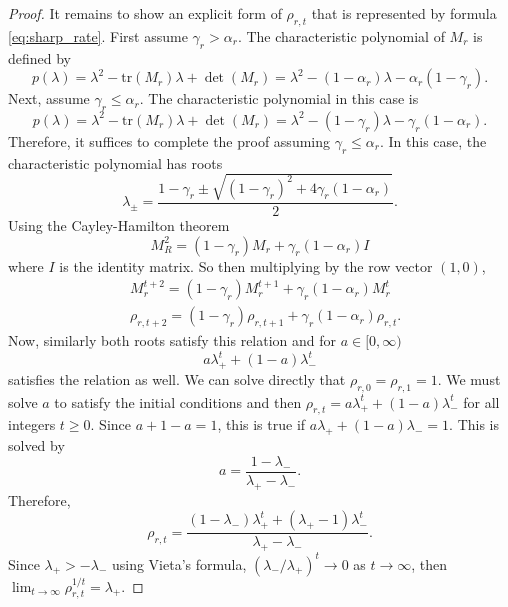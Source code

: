\documentclass[ejsv2, noshowframe]{imsart}
\theoremstyle{plain}
\theoremstyle{definition}
\theoremstyle{remark}
\newcommand{\tr}{\text{tr}}
\begin{document}
\begin{proof}
It remains to show an explicit form of $\rho_{r, t}$ that is represented by formula \eqref{eq:sharp_rate}.
First assume $\gamma_r > \alpha_r$.
The characteristic polynomial of $M_r$ is defined by
\[
p(\lambda)
= \lambda^2 - \tr(M_r) \lambda + \det(M_r)
=  \lambda^2 - (1 - \alpha_r) \lambda - \alpha_r (1 - \gamma_r).
\]
Next, assume $\gamma_r \le \alpha_r$.
The characteristic polynomial in this case is
\[
p(\lambda)
= \lambda^2 - \tr(M_r) \lambda + \det(M_r)
= \lambda^2 - (1 - \gamma_r) \lambda - \gamma_r (1 - \alpha_r).
\]
Therefore, it suffices to complete the proof assuming $\gamma_r \le \alpha_r$. 
In this case, the characteristic polynomial has roots
\[
\lambda_{\pm} = \frac{1 - \gamma_r \pm \sqrt{ (1 - \gamma_r)^2 + 4 \gamma_r (1 - \alpha_r) } }{2}.
\]
Using the Cayley-Hamilton theorem
\[
M_R^2 = (1 - \gamma_r) M_r + \gamma_r (1 - \alpha_r) I
\]
where $I$ is the identity matrix.
So then multiplying by the row vector $(1, 0)$,
\begin{align*}
&M_r^{t + 2} = (1 - \gamma_r) M_r^{t + 1} + \gamma_r (1 - \alpha_r) M_r^t
\\
&\rho_{r, t + 2} = (1 - \gamma_r) \rho_{r, t + 1} + \gamma_r (1 - \alpha_r) \rho_{r, t}.
\end{align*}
Now, similarly both roots satisfy this relation and for $a \in [0, \infty)$
\[
a \lambda_+^t + (1 - a) \lambda_-^t
\]
satisfies the relation as well.
We can solve directly that $\rho_{r, 0} = \rho_{r, 1} = 1$.
We must solve $a$ to satisfy the initial conditions and then $\rho_{r, t} = a \lambda_+^t + (1 - a) \lambda_-^t$ for all integers $t \ge 0$.
Since $a + 1 - a = 1$, this is true if
$
a \lambda_+ + (1 - a) \lambda_- = 1.
$
This is solved by 
\[
a = \frac{1 - \lambda_-}{ \lambda_+ - \lambda_- }.
\]
Therefore,
\[
\rho_{r, t}
= \frac{(1 - \lambda_-) \lambda_+^t + (\lambda_+ - 1) \lambda_-^t }{ \lambda_+ - \lambda_- }.
\]
Since $\lambda_+ > -\lambda_-$ using Vieta's formula, $(\lambda_- / \lambda_+)^t \to 0$ as $t \to \infty$, then $\lim_{t \to \infty} \rho_{r, t}^{1/t} = \lambda_+$.
\end{proof}
\end{document}
